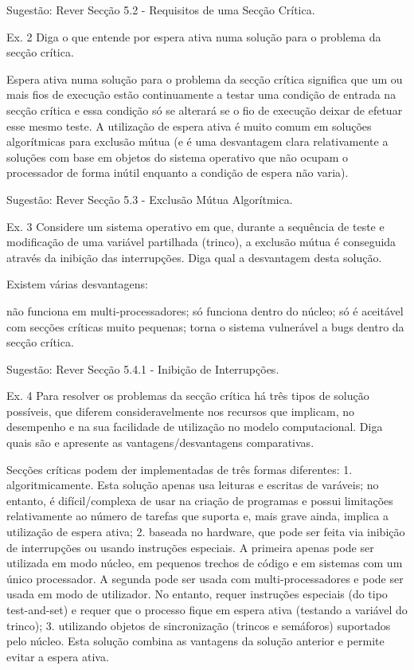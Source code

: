 \documentclass[11pt]{article}
\begin{document}
Sugestão: Rever Secção 5.2 - Requisitos de uma Secção Crítica.


Ex. 2 Diga o que entende por espera ativa numa solução para o problema da secção crítica.

Espera ativa numa solução para o problema da secção crítica significa que um ou mais fios de execução estão continuamente a testar uma condição de entrada na secção crítica e essa condição só se alterará se o fio de execução deixar de efetuar esse mesmo teste. A utilização de espera ativa é muito comum em soluções algorítmicas para exclusão mútua (e é uma desvantagem clara relativamente a soluções com base em objetos do sistema operativo que não ocupam o processador de forma inútil enquanto a condição de espera não varia).

Sugestão: Rever Secção 5.3 - Exclusão Mútua Algorítmica.


Ex. 3 Considere um sistema operativo em que, durante a sequência de teste e modificação de uma variável partilhada (trinco), a exclusão mútua é conseguida através da inibição das interrupções. Diga qual a desvantagem desta solução.

Existem várias desvantagens:

não funciona em multi-processadores;
só funciona dentro do núcleo;
só é aceitável com secções críticas muito pequenas;
torna o sistema vulnerável a bugs dentro da secção crítica.

Sugestão: Rever Secção 5.4.1 - Inibição de Interrupções.


Ex. 4 Para resolver os problemas da secção crítica há três tipos de solução possíveis, que diferem consideravelmente nos recursos que implicam, no desempenho e na sua facilidade de utilização no modelo computacional. Diga quais são e apresente as vantagens/desvantagens comparativas.

Secções críticas podem der implementadas de três formas diferentes:
1. algoritmicamente. Esta solução apenas usa leituras e escritas de varáveis; no entanto, é difícil/complexa de usar na criação de programas e possui limitações relativamente ao número de tarefas que suporta e, mais grave ainda, implica a utilização de espera ativa;
2. baseada no hardware, que pode ser feita via inibição de interrupções ou usando instruções especiais. A primeira apenas pode ser utilizada em modo núcleo, em pequenos trechos de código e em sistemas com um único processador. A segunda pode ser usada com multi-processadores e pode ser usada em modo de utilizador. No entanto, requer instruções especiais (do tipo test-and-set) e requer que o processo fique em espera ativa (testando a variável do trinco);
3. utilizando objetos de sincronização (trincos e semáforos) suportados pelo núcleo. Esta solução combina as vantagens da solução anterior e permite evitar a espera ativa.
\end{document}
